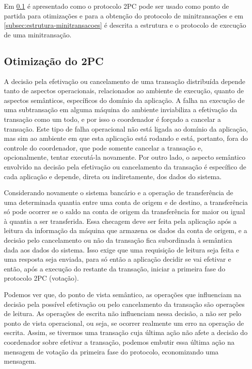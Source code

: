 \documentclass[11pt,twoside,a4paper]{book}
\begin{document}
Em \ref{subsec:derivando-minitransacoes} é apresentado como o protocolo 2PC pode ser usado como ponto de partida para otimizações e para a obtenção do protocolo de minitransações e em \ref{subsec:estrutura-minitransacoes} é descrita a estrutura e o protocolo de execução de uma minitransação.

\subsection{Otimização do 2PC}
\label{subsec:derivando-minitransacoes}
A decisão pela efetivação ou cancelamento de uma transação distribuída depende tanto de aspectos operacionais, relacionados ao ambiente de execução, quanto de aspectos semânticos, específicos do domínio da aplicação. A falha na execução de uma subtransação em alguma máquina do ambiente inviabiliza a efetivação da transação como um todo, e por isso o coordenador é forçado a cancelar a transação. Este tipo de falha operacional não está ligada ao domínio da aplicação, mas sim ao ambiente em que esta aplicação está rodando e está, portanto, fora do controle do coordenador, que pode somente cancelar a transação e, opcionalmente, tentar executá-la novamente. Por outro lado, o aspecto semântico envolvido na decisão pela efetivação ou cancelamento da transação é específico de cada aplicação e depende, direta ou indiretamente, dos dados do sistema.

Considerando novamente o sistema bancário e a operação de transferência de uma determinada quantia entre uma conta de origem e de destino, a transferência só pode ocorrer se o saldo na conta de origem da transferência for maior ou igual à quantia a ser transferida. Essa checagem deve ser feita pela aplicação após a leitura da informação da máquina que armazena os dados da conta de origem, e a decisão pelo cancelamento ou não da transação fica subordinada à semântica dada aos dados do sistema. Isso exige que uma requisição de leitura seja feita e uma resposta seja enviada, para só então a aplicação decidir se vai efetivar e então, após a execução do restante da transação, iniciar a primeira fase do protocolo 2PC (votação).

Podemos ver que, do ponto de vista semântico, as operações que influenciam na decisão pela possível efetivação ou pelo cancelamento da transação são operações de leitura. As operações de escrita não influenciam nessa decisão, a não ser pelo ponto de vista operacional, ou seja, se ocorrer realmente um erro na operação de escrita. Assim, se tivermos uma transação cuja última ação não afete a decisão do coordenador sobre efetivar a transação, podemos embutir essa última ação na mensagem de votação da primeira fase do protocolo, economizando uma mensagem.
\end{document}
